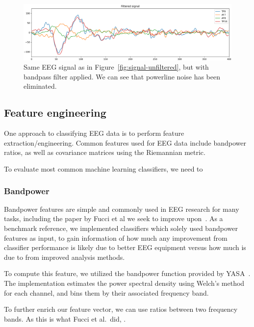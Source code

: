         \begin{figure}[h]
            \includegraphics[width=14cm]{img/raw-signal-postfilter.png}
            \caption{Same EEG signal as in Figure~\ref{fig:signal-unfiltered}, but with bandpass filter applied. We can see that powerline noise has been eliminated.}\label{fig:signal-filtered}
        \end{figure}

    \subsection{Feature engineering}

        One approach to classifying EEG data is to perform feature extraction/engineering. Common features used for EEG data include bandpower ratios, as well as covariance matrices using the Riemannian metric.

        To evaluate most common machine learning classifiers, we need to

        \subsubsection{Bandpower}


            Bandpower features are simple and commonly used in EEG research for many tasks, including the paper by Fucci et al we seek to improve upon~\cite{fucci_replication_2019}. As a benchmark reference, we implemented classifiers which solely used bandpower features as input, to gain information of how much any improvement from classifier performance is likely due to better EEG equipment versus how much is due to from improved analysis methods.

            To compute this feature, we utilized the bandpower function provided by YASA~\cite{vallat_yasa_2020}. The implementation estimates the power spectral density using Welch's method for each channel, and bins them by their associated frequency band.

            To further enrich our feature vector, we can use ratios between two frequency bands. As this is what Fucci et al.\ did, .

